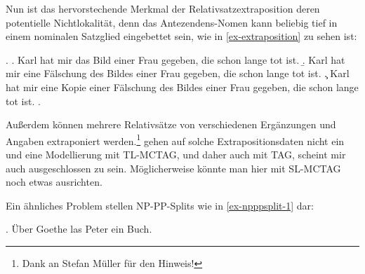 Nun ist das hervorstechende Merkmal der Relativsatzextraposition deren potentielle Nichtlokalität, denn das Antezendens-Nomen kann beliebig tief in einem nominalen Satzglied eingebettet sein, wie in \ref{ex-extraposition} zu sehen ist:

\ex. \label{ex-extraposition}
\a. Karl hat mir das Bild einer Frau gegeben, die schon lange tot ist.
\b. Karl hat mir eine Fälschung des Bildes einer Frau gegeben, die schon lange tot ist.
\c. Karl hat mir eine Kopie einer Fälschung des Bildes einer Frau gegeben, die schon lange tot ist.
\z. \citep[(13.18)]{Mueller:99}

Au\ss erdem können mehrere Relativsätze von verschiedenen Ergänzungen und Angaben extraponiert werden.\footnote{Dank an Stefan Müller für den Hinweis!} \cite{Kroch:Joshi:87} gehen auf solche Extrapositionsdaten nicht ein und eine Modellierung mit TL-MCTAG, und daher auch mit TAG, scheint mir auch ausgeschlossen zu sein. Möglicherweise könnte man hier mit SL-MCTAG noch etwas ausrichten. %


Ein ähnliches Problem stellen NP-PP-Splits wie in \ref{ex-npppsplit-1} dar:

\ex. \label{ex-npppsplit-1} Über Goethe las Peter ein Buch. 

